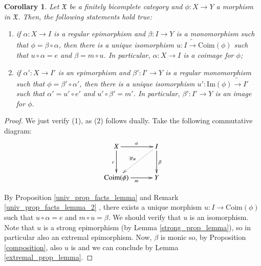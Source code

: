 \documentclass[12pt]{article}
\newtheorem{corollary}[lemma]{Corollary}
\theoremstyle{definition}
\def\X{\mathfrak X}
\def\Coim{\mathrm{Coim}}
\def\Im{\mathrm{Im}}
\numberwithin{equation}{section}
\newcommand{\id}[1]{\mathsf{id}_{#1}}
\begin{document}
\begin{corollary}\label{uniqueness_fact_coro} \reversemarginpar {} \normalmarginpar 
Let $\X$ be a finitely bicomplete category and $\phi\colon X\to Y$ a morphism in $\X$. Then, the following statements hold true:
\begin{enumerate}[\rm (1)]
\item if $\alpha\colon X\to I$ is a regular epimorphism and $\beta\colon I\to Y$ is a monomorphism such that $\phi=\beta\circ\alpha$, then there is a unique isomorphism $u\colon I\tilde\longrightarrow \Coim(\phi)$ such that $u\circ \alpha=e$ and $\beta=m\circ u$. In particular, $\alpha\colon X\to I$ is a coimage for $\phi$;
\item if $\alpha'\colon X\to I'$ is an epimorphism and $\beta'\colon I'\to Y$ is a regular monomorphism such that $\phi=\beta'\circ\alpha'$, then there is a unique isomorphism $u'\colon \Im(\phi)\tilde\longrightarrow I'$ such that $\alpha'=u'\circ e'$ and $u'\circ \beta'=m'$. In particular, $\beta'\colon I'\to Y$ is an image for $\phi$.
\end{enumerate}
\end{corollary}
\begin{proof}
We just verify (1), as (2) follows dually. Take the following commutative diagram:
\[\xymatrix@R=30pt@C=30pt{
X\ar@{>}[r]^{\alpha}\ar@{>}[d]_{e}&I\ar@{.>}[dl]_{\exists!u}\ar[d]^{\beta}\\
\Coim(\phi)\ar@{>}[r]_{m}&Y
}\]
\iffalse 
\[
\xymatrix@R=10pt@C=70pt{
X\ar[rr]^{\phi}\ar[dr]_{\alpha}\ar@{>}[dddd]_{\id{X}}&&Y\ar@{>}[dddd]^{\id{Y}}\\
&I\ar@{.>}[dd]_{\exists!u}\ar[ur]_{\beta}\\
\\
&\Coim(\phi)\ar[dr]^{m}\\
X\ar[rr]_{\phi}\ar[ur]^{e}&&Y
}
\]\fi 
By Proposition \ref{univ_prop_facts_lemma} and Remark \ref{univ_prop_facts_lemma_2} , there exists a unique morphism $u\colon I\to \Coim(\phi)$ such that $u\circ \alpha=e$ and $m\circ u=\beta$. We should verify that $u$ is an isomorphism. Note that $u$ is a strong epimorphism (by Lemma \ref{strong_prop_lemma}), so in particular also an extremal epimorphism. Now, $\beta$ is monic so, by Proposition \ref{composition}, also $u$ is and we can conclude by Lemma \ref{extremal_prop_lemma}.
\end{proof}
\end{document}
